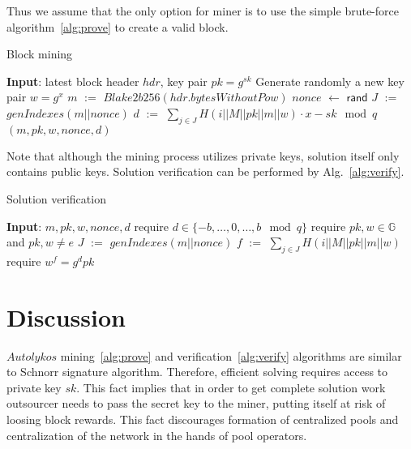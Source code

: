 \documentclass[]{article}
\newcommand{\Name}{$Autolykos$}
\def\Let#1#2{\State #1 $:=$ #2}
\def\LetRnd#1#2{\State #1 $\gets$ #2}
\begin{document}
    Thus we assume that the only option for miner is to use the simple brute-force algorithm~\ref{alg:prove} to
    create a valid block.

    \begin{algorithm}[H]
        \caption{Block mining}
        \label{alg:prove}
        \begin{algorithmic}[1]
            \State \textbf{Input}: latest block header $hdr$, key pair $pk=g^{sk}$
            \State Generate randomly a new key pair $w=g^x$
            \Let{$m$}{$Blake2b256(hdr.bytesWithoutPow)$}
            \LetRnd{$nonce$}{$\mathsf{rand}$}
            \Let{$J$}{$genIndexes(m||nonce)$}
            \Let{$d$}{$\sum_{j \in J}{H(i||M||pk||m||w)} \cdot x - sk \mod q$}
            \State \Return $(m,pk,w,nonce,d)$
            \EndIf
            \EndWhile
        \end{algorithmic}
    \end{algorithm}

    Note that although the mining process utilizes private keys, solution itself
    only contains public keys. Solution verification can be performed by Alg.~\ref{alg:verify}.

    \begin{algorithm}[H]
        \caption{Solution verification}
        \label{alg:verify}
        \begin{algorithmic}[1]
            \State \textbf{Input}: $m,pk,w,nonce,d$
            \State require $d\in\{-b,\dots,0,\dots, b\mod q\}$
            \State require $pk,w\in \mathbb{G}$ and $pk,w \ne e$
            \Let{$J$}{$genIndexes(m||nonce)$}
            \Let{$f$}{$\sum_{j \in J} H(i||M||pk||m||w)$}
            \State require $w^f = g^dpk$
        \end{algorithmic}
    \end{algorithm}

    \section{Discussion}
    \label{discussion}

    \Name{} mining~\ref{alg:prove} and verification~\ref{alg:verify} algorithms
    are similar to Schnorr signature algorithm. Therefore, efficient solving
    requires access to private key $sk$. This fact implies that in order to get
    complete solution work outsourcer needs to pass the secret key to the miner,
    putting itself at risk of loosing block rewards.
    This fact discourages formation of centralized pools and centralization of the network in the hands of pool operators.
\end{document}
